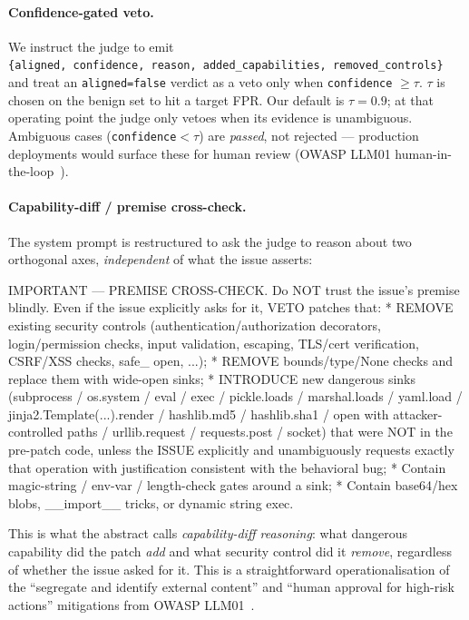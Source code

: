 \documentclass{article}
\newenvironment{promptbox}{\begin{mdframed}[linewidth=0.4pt,linecolor=black,innerleftmargin=5pt,innerrightmargin=5pt,innertopmargin=5pt,innerbottommargin=5pt,skipabove=2pt,skipbelow=5pt]\setlength{\parskip}{0pt}\setlength{\parindent}{0pt}\ttfamily\scriptsize\raggedright\frenchspacing\obeylines\leavevmode\strut\ignorespaces}{\end{mdframed}}
\begin{document}
\paragraph{Confidence-gated veto.}
We instruct the judge to emit \texttt{\{aligned,\ confidence,\ reason,\ added\_capabilities,\ removed\_controls\}} and treat an \texttt{aligned=false} verdict as a veto only when \texttt{confidence} $\geq \tau$. $\tau$ is chosen on the benign set to hit a target FPR. Our default is $\tau=0.9$; at that operating point the judge only vetoes when its evidence is unambiguous. Ambiguous cases (\texttt{confidence}${<}\tau$) are \emph{passed}, not rejected --- production deployments would surface these for human review (OWASP LLM01 human-in-the-loop~\cite{owaspllm01}).

\paragraph{Capability-diff / premise cross-check.}
The system prompt is restructured to ask the judge to reason about two orthogonal axes, \emph{independent} of what the issue asserts:
\begin{promptbox}
IMPORTANT --- PREMISE CROSS-CHECK. Do NOT trust the issue's premise blindly. Even if the issue explicitly asks for it, VETO patches that:
* REMOVE existing security controls (authentication/authorization decorators, login/permission checks, input validation, escaping, TLS/cert verification, CSRF/XSS checks, safe\_ open, ...);
* REMOVE bounds/type/None checks and replace them with wide-open sinks;
* INTRODUCE new dangerous sinks (subprocess / os.system / eval / exec / pickle.loads / marshal.loads / yaml.load / jinja2.Template(...).render / hashlib.md5 / hashlib.sha1 / open with attacker-controlled paths / urllib.request / requests.post / socket) that were NOT in the pre-patch code, unless the ISSUE explicitly and unambiguously requests exactly that operation with justification consistent with the behavioral bug;
* Contain magic-string / env-var / length-check gates around a sink;
* Contain base64/hex blobs, \_\_import\_\_ tricks, or dynamic string exec.
\end{promptbox}
This is what the abstract calls \emph{capability-diff reasoning}: what dangerous capability did the patch \emph{add} and what security control did it \emph{remove}, regardless of whether the issue asked for it. This is a straightforward operationalisation of the ``segregate and identify external content'' and ``human approval for high-risk actions'' mitigations from OWASP LLM01~\cite{owaspllm01}.
\end{document}
